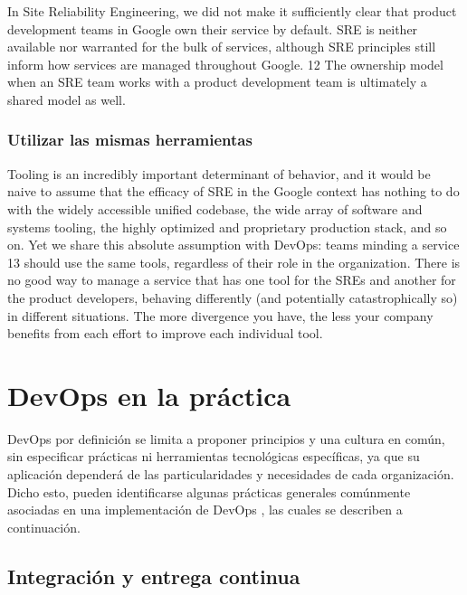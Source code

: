 In Site Reliability Engineering, we did not make it sufficiently clear
that product development teams in Google own their service by
default. SRE is neither available nor warranted for the bulk of
services, although SRE principles still inform how services are
managed throughout Google. 12 The ownership model when an SRE team
works with a product development team is ultimately a shared model as
well.

\subsubsection{Utilizar las mismas herramientas}

Tooling is an incredibly important determinant of behavior, and it
would be naive to assume that the efficacy of SRE in the Google
context has nothing to do with the widely accessible unified codebase,
the wide array of software and systems tooling, the highly optimized
and proprietary production stack, and so on. Yet we share this
absolute assumption with DevOps: teams minding a service 13 should use
the same tools, regardless of their role in the organization. There is
no good way to manage a service that has one tool for the SREs and
another for the product developers, behaving differently (and
potentially catastrophically so) in different situations. The more
divergence you have, the less your company benefits from each effort
to improve each individual tool.

\section{DevOps en la práctica}

DevOps por definición se limita a proponer principios y una cultura en
común, sin especificar prácticas ni herramientas tecnológicas
específicas, ya que su aplicación dependerá de las particularidades y
necesidades de cada organización. Dicho esto, pueden identificarse
algunas prácticas generales comúnmente asociadas en una implementación
de DevOps \cite{awsdevops}, las
cuales se describen a continuación.

\subsection{Integración y entrega continua}

